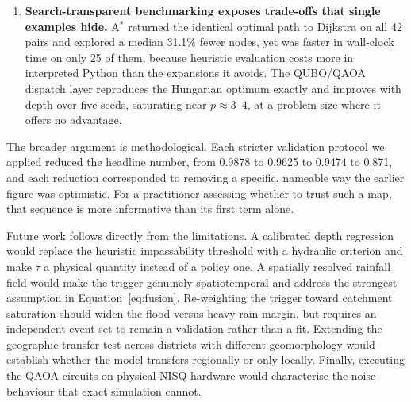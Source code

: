 \documentclass[11pt,a4paper]{article}
\begin{document}
\begin{enumerate}
      pairs at $\tau\ge0.65$, $0.55$--$0.60$ and $\le0.50$. $\tau$ should be set
      by policy on acceptable risk, not by convention.
\item \textbf{Search-transparent benchmarking exposes trade-offs that single
      examples hide.} A$^\ast$ returned the identical optimal path to Dijkstra on
      all 42 pairs and explored a median 31.1\% fewer nodes, yet was faster in
      wall-clock time on only 25 of them, because heuristic evaluation costs more
      in interpreted Python than the expansions it avoids. The QUBO/QAOA dispatch
      layer reproduces the Hungarian optimum exactly and improves with depth
      over five seeds, saturating near $p\approx3$--$4$, at a problem size where
      it offers no advantage.
\end{enumerate}

The broader argument is methodological. Each stricter validation protocol we
applied reduced the headline number, from 0.9878 to 0.9625 to 0.9474 to 0.871, and
each reduction corresponded to removing a specific, nameable way the earlier
figure was optimistic. For a practitioner assessing whether to trust such a map,
that sequence is more informative than its first term alone.

Future work follows directly from the limitations. A calibrated depth regression
would replace the heuristic impassability threshold with a hydraulic criterion
and make $\tau$ a physical quantity instead of a policy one. A spatially
resolved rainfall field would make the trigger genuinely spatiotemporal and
address the strongest assumption in Equation~\eqref{eq:fusion}. Re-weighting the
trigger toward catchment saturation should widen the flood versus heavy-rain
margin, but requires an independent event set to remain a validation rather than
a fit. Extending the geographic-transfer test across districts with different
geomorphology would establish whether the model transfers regionally or only
locally. Finally, executing the QAOA circuits on physical NISQ hardware would
characterise the noise behaviour that exact simulation cannot.
\end{document}
